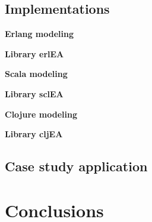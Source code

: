 \documentclass[a4paper]{llncs}
\newcommand{\simpleEntry}[1]
{
\vspace{.3cm}
\noindent \textbf{#1}
\vspace{.3cm}
}
\begin{document}
\subsection{Implementations}
\label{sec:impl}
    

\simpleEntry{Erlang modeling}
    

\simpleEntry{Library erlEA}
    

\simpleEntry{Scala modeling}
    

\simpleEntry{Library sclEA}
    

\simpleEntry{Clojure modeling}
    

\simpleEntry{Library cljEA}
    

\subsection{Case study application}
    

\section{Conclusions}
\label{sec:conclusions}
    


%




\end{document}
